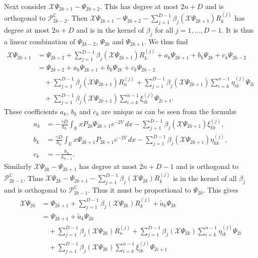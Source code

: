 \documentclass[12pt]{article}
\theoremstyle{definition}
\begin{document}
Next consider $\mathscr{X} \Psi_{2k+1} - \Psi_{2k+2}$.  This has degree at most $2n+D$ and is orthogonal to $\mathscr{P}_{2k-2}^\mathbb{C}$. Then $\mathscr{X} \Psi_{2k+1}- \Psi_{2k+2} - \sum_{j=1}^{D-1} \beta_j ( \mathscr{X} \Psi_{2k+1}) R_k^{(j)}$ has degree at most $2n+D$ and is in the kernel of $\beta_j$ for all $j=1, \dots, D-1$. It is thus a linear combination of $\Psi_{2k-2}$, $\Psi_{2k}$ and $\Psi_{2k+1}$. We thus find
\begin{equation}
\begin{split}
\mathscr{X} \Psi_{2k+1} &=  \Psi_{2k+2} + \sum_{j=1}^{D-1} \beta_j ( \mathscr{X} \Psi_{2k+1}) R_k^{(j)} + a_k  \Psi_{2k+1} + b_k \Psi_{2k} + c_k \Psi_{2k-2} \\
&= \Psi_{2k+2} + a_k  \Psi_{2k+1} + b_k \Psi_{2k} + c_k \Psi_{2k-2} \\
&\quad + \sum_{j=1}^{D-1} \beta_j ( \mathscr{X} \Psi_{2k+1}) R_n^{(j)} + \sum_{j=1}^{D-1} \beta_j ( \mathscr{X} \Psi_{2k+1}) \sum_{i=k}^{n-1} \eta_{ik}^{(j)} \Psi_{2i} \\
&\quad + \sum_{j=1}^{D-1} \beta_j ( \mathscr{X} \Psi_{2k+1}) \sum_{i=k}^{n-1} \xi_{ik}^{(j)} \Psi_{2i+1} .
\end{split}
\end{equation}
These coefficients $a_k$, $b_k$ and $c_k$ are unique as can be seen from the formulæ
\begin{align*}
a_k &= 
 - \frac{\gamma D}{h_k} \int_\mathbb{R} x P_{2k} \Psi_{2k+1} e^{-2V} \, dx -\sum_{j=1}^{D-1} \beta_j ( \mathscr{X} \Psi_{2k+1}) \xi^{(j)}_{kk} , \\
b_k &= \frac{\gamma D}{h_k} \int_\mathbb{R} x \Psi_{2k+1} P_{2k+1} e^{-2V} \, dx -  \sum_{j=1}^{D-1}\beta_j( \mathscr{X} \Psi_{2k+1}) \eta^{(j)}_{kk} , \\
c_k &= - \frac{h_k}{h_{k-1}} .
\end{align*}
Similarly $\mathscr{X} \Psi_{2k}- \Psi_{2k+1}$ has degree at most $2n+D-1$ and is orthogonal to $ \mathscr{P}_{2k-1}^\mathbb{C}$. Thus $\mathscr{X}\Psi_{2k} -  \Psi_{2k+1} - \sum_{j=1}^{D-1} \beta_j(\mathscr{X}\Psi_{2k} ) R_k^{(j)}$ is in the kernel of all $\beta_j$ and is orthogonal to $\mathscr{P}_{2k-1}^\mathbb{C}$. Thus it must be proportional to $\Psi_{2k}$. This gives
\begin{equation}\label{formula}
\begin{split}
\mathscr{X}\Psi_{2k} &=  \Psi_{2k+1}+ \sum_{j=1}^{D-1} \beta_j(\mathscr{X}\Psi_{2k} ) R_k^{(j)} + \tilde{a}_k \Psi_{2k} \\
&= \Psi_{2k+1} + \tilde{a}_k \Psi_{2k} \\
&\quad + \sum_{j=1}^{D-1} \beta_j(\mathscr{X}\Psi_{2k} ) R_n^{(j)} + \sum_{j=1}^{D-1} \beta_j(\mathscr{X}\Psi_{2k} ) \sum_{i=k}^{n-1} \eta_{ik}^{(j)} \Psi_{2i} \\
&\quad  + \sum_{j=1}^{D-1} \beta_j(\mathscr{X}\Psi_{2k} ) \sum_{i=k}^{n-1} \xi_{ik}^{(j)} \Psi_{2i+1}
\end{split}
\end{equation}
\end{document}
